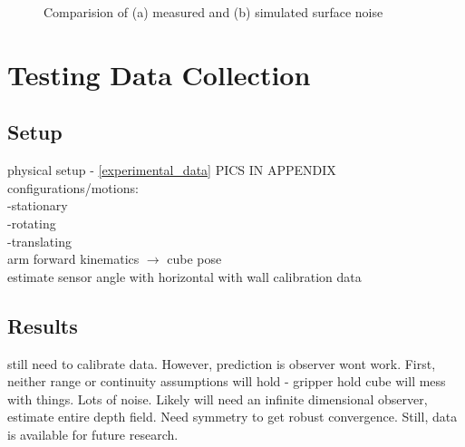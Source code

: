 \begin{figure}
{\begin{minipage}[b]{0.45\columnwidth}
 			\end{minipage}}
	  		\caption{Comparision of (a) measured and (b) simulated surface noise}
	  		\label{fig:surface_noise}
		\end{figure}

\section{Testing Data Collection}
	\subsection{Setup}
		physical setup - \ref{experimental_data} PICS IN APPENDIX\\
		
		configurations/motions: \\
			-stationary\\
			-rotating\\
			-translating\\					
		arm forward kinematics $\rightarrow$ cube pose\\
		estimate sensor angle with horizontal with wall calibration data		
		
	\subsection{Results}
		still need to calibrate data.
		However, prediction is observer wont work. First, neither range or continuity assumptions will hold - gripper hold cube will mess with things. Lots of noise.
		Likely will need an infinite dimensional observer, estimate entire depth field. Need symmetry to get robust convergence.
		Still, data is available for future research.

